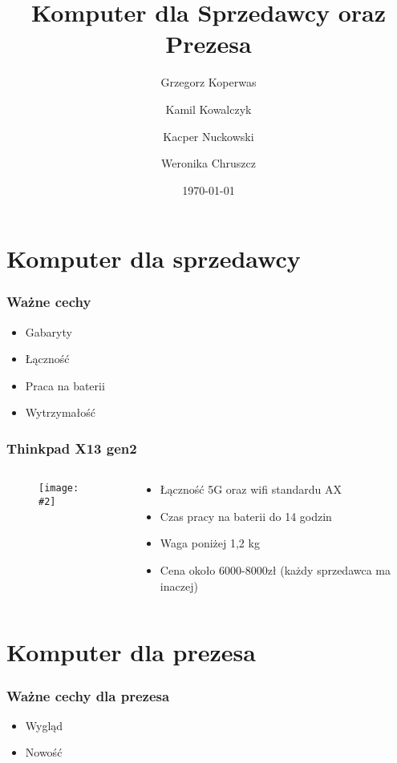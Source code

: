\documentclass[aspectratio=169]{beamer}
\title{Komputer dla Sprzedawcy oraz Prezesa}
\author{Grzegorz Koperwas \and Kamil Kowalczyk \and Kacper Nuckowski \and Weronika Chruszcz}
\date{\today}
\newcommand{\obrazek}[2]{
\begin{figure}[h]
    \centering
    \texttt{[image: \#2]}
\end{figure}
}
\begin{document}
\begin{frame}
    \titlepage
\end{frame}
\section{Komputer dla sprzedawcy}
\begin{frame}
    \frametitle{Ważne cechy}
    \begin{itemize}
        \item Gabaryty
        \item Łączność
        \item Praca na baterii
        \item Wytrzymałość
    \end{itemize}
\end{frame}

\begin{frame}
    \frametitle{Thinkpad X13 gen2}
    \begin{columns}
        \begin{column}{.5\textwidth}
            \obrazek{.4}{thonkpad.png}
        \end{column}
        \begin{column}{.5\textwidth}
            \begin{itemize}
                \item Łączność 5G oraz wifi standardu AX
                \item Czas pracy na baterii do 14 godzin
                \item Waga poniżej 1,2 kg
                \item Cena około 6000-8000zł (każdy sprzedawca ma inaczej)
            \end{itemize}
        \end{column}
    \end{columns}
\end{frame}

\section{Komputer dla prezesa}
\begin{frame}
    \frametitle{Ważne cechy dla prezesa}
    \begin{itemize}
        \item Wygląd
        \item Nowość
    \end{itemize}
\end{frame}
\end{document}
